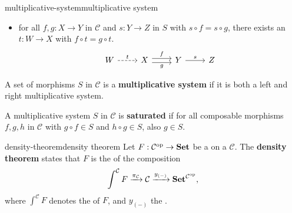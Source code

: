\begin{topic}{multiplicative-system}{multiplicative system}
\begin{itemize}
        \[ \begin{tikzcd} X \arrow[dashed]{r}{f} \arrow[dashed, swap]{d}{t} & Y \arrow{d}{s} \\ Z \arrow{r}{g} & W \end{tikzcd} \]
        \item for all $f, g : X \to Y$ in $\mathcal{C}$ and $s : Y \to Z$ in $S$ with $s \circ f = s \circ g$, there exists an $t : W \to X$ with $f \circ t = g \circ t$.
        \[ \begin{tikzcd} W \arrow[dashed]{r}{t} & X \arrow[shift left=0.25em]{r}{f} \arrow[swap, shift right=0.25em]{r}{g} & Y \arrow{r}{s} & Z \end{tikzcd} \]
    \end{itemize}
    A set of morphisms $S$ in $\mathcal{C}$ is a \textbf{multiplicative system} if it is both a left and right multiplicative system.
    
    A multiplicative system $S$ in $\mathcal{C}$ is \textbf{saturated} if for all composable morphisms $f, g, h$ in $\mathcal{C}$ with $g \circ f \in S$ and $h \circ g \in S$, also $g \in S$.
\end{topic}

\begin{topic}{density-theorem}{density theorem}
    Let $F : \mathcal{C}^\textup{op} \to \textbf{Set}$ be a  on a  $\mathcal{C}$. The \textbf{density theorem} states that $F$ is the  of the composition
    \[ \int^\mathcal{C} F \xrightarrow{\pi_\mathcal{C}} \mathcal{C} \xrightarrow{y_{(-)}} \textbf{Set}^{\mathcal{C}^\textup{op}} , \]
    where $\int^\mathcal{C} F$ denotes the  of $F$, and $y_{(-)}$ the .
\end{topic}

